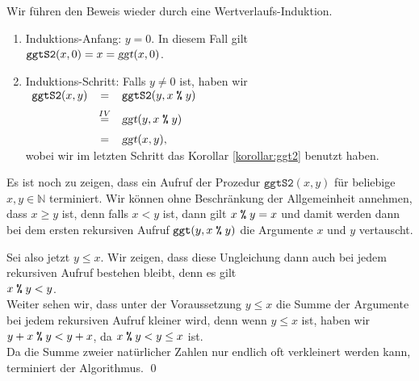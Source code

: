 \proof
Wir f\"{u}hren den Beweis wieder durch eine Wertverlaufs-Induktion.
\begin{enumerate}
\item Induktions-Anfang: $y = 0$.  In diesem Fall gilt
      \\[0.2cm]
      \hspace*{1.3cm}
      $\mathtt{ggtS2}(x, 0) = x = \textsl{ggt}(x, 0)$.
\item Induktions-Schritt: Falls $y \not= 0$ ist, haben wir
      \\[0.2cm]
      \hspace*{1.3cm}
      $
      \begin{array}[t]{lcl}
        \mathtt{ggtS2}(x, y) & = & \mathtt{ggtS2}(y, x \;\texttt{\%}\; y)              \\[0.2cm]
                             & \stackrel{IV}{=} & \textsl{ggt}(y, x \;\texttt{\%}\; y) \\[0.2cm]
                             & = & \textsl{ggt}(x, y),
      \end{array}
      $
      \\[0.2cm]
      wobei wir im letzten Schritt das Korollar \ref{korollar:ggt2} benutzt haben. 
\end{enumerate}
Es ist noch zu zeigen, dass ein Aufruf der Prozedur $\texttt{ggtS2}(x, y)$ f\"{u}r beliebige
$x,y \in \mathbb{N}$ terminiert.  Wir k\"{o}nnen ohne Beschr\"{a}nkung der Allgemeinheit annehmen,
dass $x \geq y$ ist, denn falls $x < y$ ist, dann gilt $x \;\texttt{\%}\; y = x$ und damit werden
dann bei dem ersten rekursiven Aufruf $\mathtt{ggt}(y, x \;\texttt{\%}\; y)$ die Argumente $x$ und
$y$ vertauscht.

Sei also jetzt $y \leq x$.  Wir zeigen, dass diese Ungleichung dann auch bei jedem
rekursiven Aufruf bestehen bleibt, denn es gilt
\\[0.2cm]
\hspace*{1.3cm}
$x \;\texttt{\%}\; y < y$.
\\[0.2cm]
Weiter sehen wir, dass unter der Voraussetzung $y \leq x$ die Summe der Argumente bei
jedem rekursiven Aufruf kleiner wird,
denn wenn $y \leq x$ ist, haben wir
\\[0.2cm]
\hspace*{1.3cm}
$y + x \;\texttt{\%}\; y < y + x$, \quad da $x \;\texttt{\%}\; y < y \leq x$ ist.
\\[0.2cm]
Da die Summe zweier nat\"{u}rlicher Zahlen nur endlich oft verkleinert werden kann, 
terminiert der Algorithmus.  
\qed


